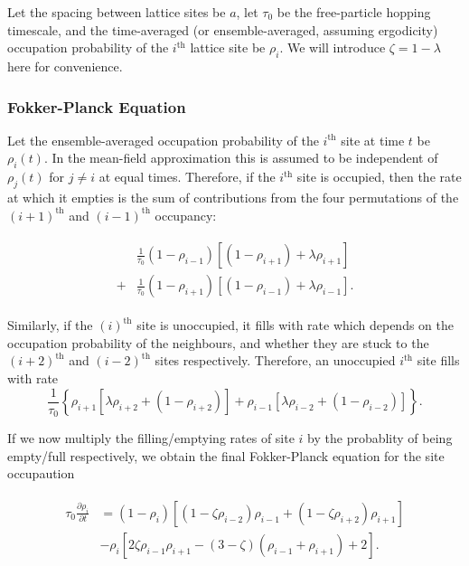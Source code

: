 \documentclass[
reprint, amsmath,amssymb,
]{revtex4-1}
\newcommand{\partDeriv}[2]{\frac{\partial #1}{\partial #2}}
\begin{document}
Let the spacing between lattice
sites be $a$, let $\tau_0$ be the free-particle hopping timescale, and
the time-averaged (or ensemble-averaged, assuming ergodicity)
occupation probability of the $i^{\mathrm{th}}$ lattice site be
$\rho_i$.  We will introduce $\zeta = 1 - \lambda $ here for convenience.

\subsubsection{Fokker-Planck Equation} Let the ensemble-averaged occupation
probability of the $i^\mathrm{th}$ site at time $t$ be $\rho_i
(t)$. In the mean-field approximation this is assumed to be
independent of $\rho_j(t)$ for $j \neq i $ at equal times. Therefore,
if the $i^\mathrm{th}$ site is occupied, then the rate at which it empties
is the sum of contributions from the
four permutations of the $(i+1)^\mathrm{th}$ and
$(i-1)^\mathrm{th}$ occupancy: 

\begin{align}
\begin{split}
 &\frac{1}{\tau_0 } (1-\rho_{i-1})\left[ (1 - \rho_{i+1}) + \lambda \rho_{i+1} \right] \\
 +&\frac{1}{\tau_0 } (1-\rho_{i+1})\left[ (1 - \rho_{i-1}) + \lambda \rho_{i-1} \right] .
\end{split}
 \end{align}

Similarly, if the $(i)^\mathrm{th}$ site is unoccupied, it fills with
rate which depends on the occupation probability of the neighbours,
and whether they are stuck to the $(i+2)^\mathrm{th}$ and $(i-2)^\mathrm{th}$ sites
respectively. Therefore, an unoccupied $i^\mathrm{th}$ site fills with rate
\begin{equation}
\frac{1}{\tau_0 } \left\{ \rho_{i+1} \left[ \lambda \rho_{i+2} + (1-\rho_{i+2}) \right] + \rho_{i-1} \left[ \lambda \rho_{i-2} + (1-\rho_{i-2}) \right] \right\}.
\end{equation}

If we now multiply the filling/emptying rates of site $i$ by the
probablity of being empty/full respectively, we obtain the
final Fokker-Planck equation for the site occupaution 

\begin{align}
\label{eq:latticeMFT}
\begin{split}
 \tau_0 \partDeriv{\rho_i}{t} &= \left( 1-\rho_i \right) \left[ \left(1-\zeta\rho_{i-2} \right) \rho_{i-1} + \left(1-\zeta\rho_{i+2} \right) \rho_{i+1} \right] \\
 &- \rho_i \left[ 2 \zeta \rho_{i-1} \rho_{i+1}  - (3-\zeta)\left(\rho_{i-1} + \rho_{i+1}\right) + 2 \right].
 \end{split}
 \end{align}
\end{document}
